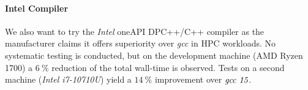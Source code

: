 	\paragraph{Intel Compiler}
		We also want to try the \emph{Intel\textsuperscript{\tiny\textregistered}} oneAPI DPC++/C++ compiler as the manufacturer claims it offers superiority over \emph{gcc} in HPC workloads. No systematic testing is conducted, but on the development machine (AMD Ryzen 1700) a $\SI{6}{\percent}$ reduction of the total wall-time is observed. Tests on a second machine (\emph{Intel\textsuperscript{\tiny\textregistered} i7-10710U}) yield a $\SI{14}{\percent}$ improvement over $\emph{gcc 15}$.
			
	


	
